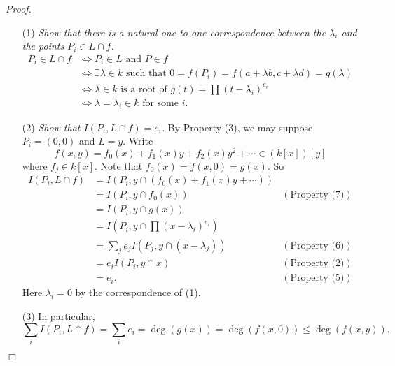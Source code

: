\documentclass{article}
\begin{document}
\emph{Proof.}
\begin{enumerate}
\item[(1)]
  \emph{Show that there is a natural one-to-one correspondence between
  the $\lambda_i$ and the points $P_i \in L \cap f$.}
  \begin{align*}
    P_i \in L \cap f
    &\Longleftrightarrow
    P_i \in L \text{ and } P \in f \\
    &\Longleftrightarrow
    \exists \lambda \in k \text{ such that }
    0 = f(P_i) = f(a+\lambda b, c+\lambda d) = g(\lambda) \\
    &\Longleftrightarrow
    \text{$\lambda \in k$ is a root of $g(t) = \prod (t - \lambda_i)^{e_i}$} \\
    &\Longleftrightarrow
    \lambda = \lambda_i \in k \text{ for some } i.
  \end{align*}

\item[(2)]
  \emph{Show that $I(P_i, L \cap f) = e_i$.}
  By Property (3),
  we may suppose $P_i = (0,0)$ and $L = y$.
  Write
  \[
    f(x,y) = f_0(x) + f_1(x)y + f_2(x)y^2 + \cdots \in (k[x])[y]
  \]
  where $f_j \in k[x]$.
  Note that $f_0(x) = f(x,0) = g(x)$.
  So
  \begin{align*}
    I(P_i, L \cap f)
    &= I(P_i, y \cap (f_0(x) + f_1(x)y + \cdots)) \\
    &= I(P_i, y \cap f_0(x))
      &(\text{Property (7)}) \\
    &= I(P_i, y \cap g(x)) \\
    &= I\left( P_i, y \cap \prod (x - \lambda_i)^{e_i} \right) \\
    &= \sum_j e_j I(P_j, y \cap (x - \lambda_j))
      &(\text{Property (6)}) \\
    &= e_i I(P_i, y \cap x)
      &(\text{Property (2)}) \\
    &= e_i.
      &(\text{Property (5)})
  \end{align*}
  Here $\lambda_i = 0$ by the correspondence of (1).

\item[(3)]
  In particular,
  \[
    \sum_i I(P_i, L \cap f)
    = \sum_i e_i
    = \deg(g(x))
    = \deg(f(x,0))
    \leq \deg(f(x,y)).
  \]
\end{enumerate}
$\Box$ \\\\



\end{document}
